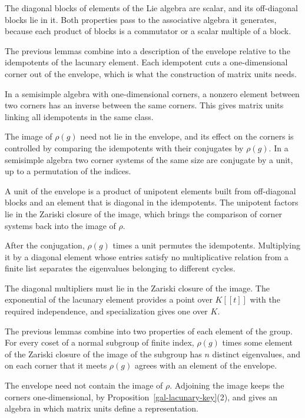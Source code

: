 The diagonal blocks of elements of the Lie algebra are scalar, and its off-diagonal blocks lie in it.
Both properties pass to the associative algebra it generates, because each product of blocks is a
commutator or a scalar multiple of a block.

The previous lemmas combine into a description of the envelope relative to the idempotents of the
lacunary element. Each idempotent cuts a one-dimensional corner out of the envelope, which is what the
construction of matrix units needs.

In a semisimple algebra with one-dimensional corners, a nonzero element between two corners has an
inverse between the same corners. This gives matrix units linking all idempotents in the same class.

The image of $\rho(g)$ need not lie in the envelope, and its effect on the corners is controlled by
comparing the idempotents with their conjugates by $\rho(g)$. In a semisimple algebra two corner
systems of the same size are conjugate by a unit, up to a permutation of the indices.

A unit of the envelope is a product of unipotent elements built from off-diagonal blocks and an element
that is diagonal in the idempotents. The unipotent factors lie in the Zariski closure of the image,
which brings the comparison of corner systems back into the image of $\rho$.

After the conjugation, $\rho(g)$ times a unit permutes the idempotents. Multiplying it by a diagonal
element whose entries satisfy no multiplicative relation from a finite list separates the eigenvalues
belonging to different cycles.

The diagonal multipliers must lie in the Zariski closure of the image. The exponential of the lacunary
element provides a point over $K[[t]]$ with the required independence, and specialization gives one
over $K$.

The previous lemmas combine into two properties of each element of the group. For every coset of a
normal subgroup of finite index, $\rho(g)$ times some element of the Zariski closure of the image of
the subgroup has $n$ distinct eigenvalues, and on each corner that it meets $\rho(g)$ agrees with an
element of the envelope.

The envelope need not contain the image of $\rho$. Adjoining the image keeps the corners
one-dimensional, by Proposition~\ref{gal-lacunary-key}(2), and gives an algebra in which matrix units
define a representation.

